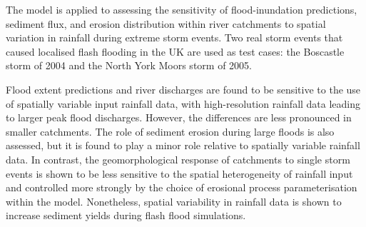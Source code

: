 The model is applied to assessing the sensitivity of flood-inundation predictions, sediment flux, and erosion distribution within river catchments to spatial variation in rainfall during extreme storm events. Two real storm events that caused localised flash flooding in the UK are used as test cases: the Boscastle storm of 2004 and the North York Moors storm of 2005. 

Flood extent predictions and river discharges are found to be sensitive to the use of spatially variable input rainfall data, with high-resolution rainfall data leading to larger peak flood discharges. However, the differences are less pronounced in smaller catchments. The role of sediment erosion during large floods is also assessed, but it is found to play a minor role relative to spatially variable rainfall data. In contrast, the geomorphological response of catchments to single storm events is shown to be less sensitive to the spatial heterogeneity of rainfall input and controlled more strongly by the choice of erosional process parameterisation within the model. Nonetheless, spatial variability in rainfall data is shown to increase sediment yields during flash flood simulations.



%
%
%

